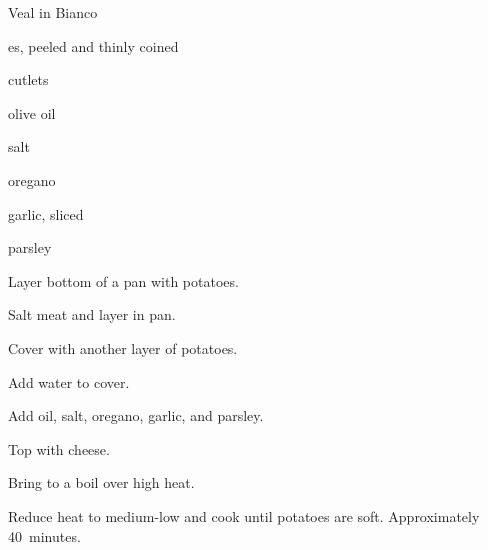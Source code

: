 \begin{recipe}{Veal in Bianco}{}{}

\begin{ingredients}
\item {}es, peeled and thinly coined
\item {} cutlets
\item olive oil
\item salt
\item oregano
\item garlic, sliced
\item parsley
\item {}
\end{ingredients}

\begin{directions}
\item Layer bottom of a pan with potatoes.
\item Salt meat and layer in pan.
\item Cover with another layer of potatoes.
\item Add water to cover.
\item Add oil, salt, oregano, garlic, and parsley.
\item Top with cheese.
\item Bring to a boil over high heat.
\item Reduce heat to medium-low and cook until potatoes are soft. Approximately 40~minutes.
\end{directions}

\hint{}
\end{recipe}
